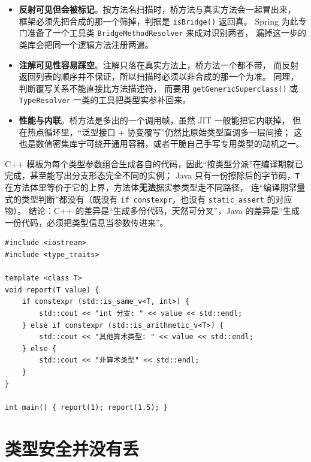 \documentclass[12pt,a4paper,fontset=fandol]{ctexbook}
\newcommand{\cpplabel}{%
  \tcbox[on line,colback=cppheadbg,colframe=cppheadbg,
    boxrule=0pt,arc=1pt,left=2pt,right=2pt,top=1pt,bottom=1pt,
    colupper=white,fontupper=\scriptsize\bfseries]{C++}}
\newcommand{\cpp}[1]{C++#1}
\newcommand{\kw}[1]{\texttt{#1}}
\begin{document}
\begin{itemize}
  \item \textbf{反射可见但会被标记}。按方法名扫描时，桥方法与真实方法会一起冒出来，
        框架必须先把合成的那一个筛掉，判据是 \kw{isBridge()} 返回真。
        Spring 为此专门准备了一个工具类 \kw{BridgeMethodResolver} 来成对识别两者，
        漏掉这一步的类库会把同一个逻辑方法注册两遍。
  \item \textbf{注解可见性容易踩空}。注解只落在真实方法上，桥方法一个都不带，
        而反射返回列表的顺序并不保证，所以扫描时必须以非合成的那一个为准。
        同理，判断覆写关系不能直接比方法描述符，
        而要用 \kw{getGenericSuperclass()} 或 \kw{TypeResolver} 一类的工具把类型实参补回来。
  \item \textbf{性能与内联}。桥方法是多出的一个调用帧，虽然 JIT 一般能把它内联掉，
        但在热点循环里，“泛型接口 + 协变覆写”仍然比原始类型直调多一层间接；
        这也是数值密集库宁可绕开通用容器，或者干脆自己手写专用类型的动机之一。
\end{itemize}

\begin{compare}[title={能否按类型参数分派运行期行为：\cpp{} 模板与 Java 擦除}]
\cpp{} 模板为每个类型参数组合生成各自的代码，因此“按类型分派”在编译期就已完成，甚至能写出分支形态完全不同的实例；
Java 只有一份擦除后的字节码，\kw{T} 在方法体里等价于它的上界，方法体\textbf{无法}据实参类型走不同路径，
连“编译期常量式的类型判断”都没有（既没有 \kw{if constexpr}，也没有 \kw{static\_assert} 的对应物）。
结论：\cpp{} 的差异是“生成多份代码，天然可分叉”，Java 的差异是“生成一份代码，必须把类型信息当参数传进来”。
\end{compare}

\cpplabel
\begin{lstlisting}[style=cppstyle,caption={\cpp{} 可以按类型参数分叉；Java 的等价做法是把 Class 或 Type 作为显式参数传入}]
#include <iostream>
#include <type_traits>

template <class T>
void report(T value) {
    if constexpr (std::is_same_v<T, int>) {
        std::cout << "int 分支: " << value << std::endl;
    } else if constexpr (std::is_arithmetic_v<T>) {
        std::cout << "其他算术类型: " << value << std::endl;
    } else {
        std::cout << "非算术类型" << std::endl;
    }
}

int main() { report(1); report(1.5); }
\end{lstlisting}

\section{类型安全并没有丢}
\end{document}
